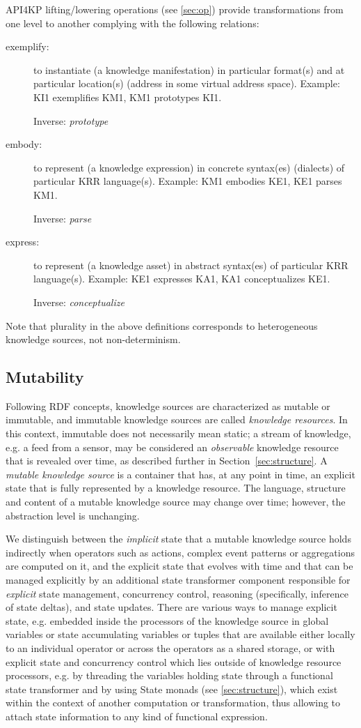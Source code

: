 \documentclass[runningheads]{llncs}
\begin{document}
API4KP lifting/lowering operations (see \ref{sec:op}) provide transformations from one level to another complying with the following relations:
\begin{description}
\item[exemplify:] to instantiate (a knowledge manifestation) in particular format(s) and at particular location(s) (address in some virtual address space). Example: KI1 exemplifies KM1, KM1 prototypes KI1.

Inverse: \emph{prototype}
\item[embody:] to represent (a knowledge expression) in concrete syntax(es) (dialects) of particular KRR language(s). Example: KM1 embodies KE1, KE1 parses KM1.

Inverse: \emph{parse}
\item[express:] to represent (a knowledge asset) in abstract syntax(es) of particular KRR language(s). Example: KE1 expresses KA1, KA1 conceptualizes KE1.

Inverse: \emph{conceptualize}
\end{description}
Note that plurality in the above definitions corresponds to heterogeneous knowledge sources, not non-determinism.

\subsection{Mutability}
Following RDF concepts\cite{RDF2014}, knowledge sources are characterized as mutable or immutable, and immutable knowledge sources are called \emph{knowledge resources}. In this context, immutable does not necessarily mean static;  a stream of knowledge, e.g. a feed from a sensor, may be considered an \emph{observable} knowledge resource that is revealed over time, as described further in Section~\ref{sec:structure}.
A \emph{mutable knowledge source} is a container that has, at any point in time, an explicit state that is fully represented by a knowledge resource. The language, structure and content of a mutable knowledge source may change over time; however, the abstraction level is unchanging.

We distinguish between the \textit{implicit} state that a mutable knowledge source holds indirectly when operators such as actions, complex  event patterns or aggregations are computed on it, and the explicit state that evolves with time and that can be managed explicitly by an additional state transformer component responsible for \textit{explicit} state management, concurrency control, reasoning (specifically, inference of state deltas), and state updates. 
There are various ways to manage explicit state, e.g. embedded inside the processors of the knowledge source in global variables or state accumulating variables or tuples that are available either locally to an individual operator or across the operators as a shared storage, or with explicit state and concurrency control which lies outside of knowledge resource processors, e.g. by threading the variables holding state through a functional state transformer and by using State monads (see \ref{sec:structure}), which exist within the context of another computation or transformation, thus allowing to attach state information to any kind of functional expression.
\end{document}
